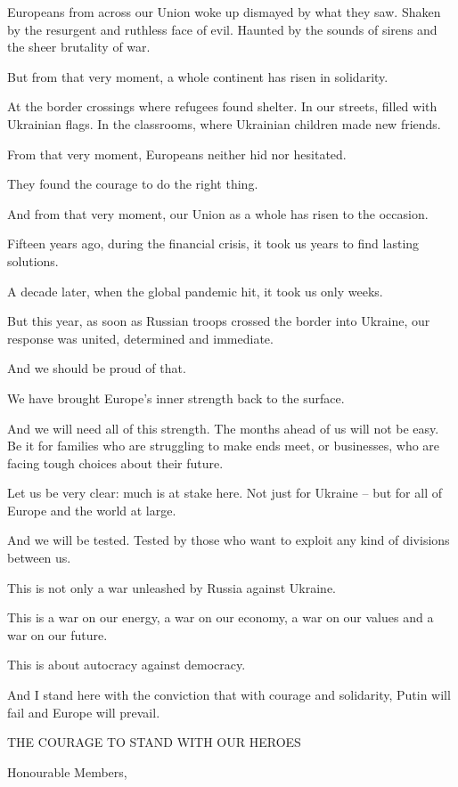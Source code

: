 \documentclass[a4paper,11pt]{article}
\begin{document}
Europeans from across our Union woke up dismayed by what they saw. Shaken by the resurgent and ruthless face of evil. Haunted by the sounds of sirens and the sheer brutality of war.

But from that very moment, a whole continent has risen in solidarity.

At the border crossings where refugees found shelter. In our streets, filled with Ukrainian flags. In the classrooms, where Ukrainian children made new friends.

From that very moment, Europeans neither hid nor hesitated.

They found the courage to do the right thing.

And from that very moment, our Union as a whole has risen to the occasion.

Fifteen years ago, during the financial crisis, it took us years to find lasting solutions.

A decade later, when the global pandemic hit, it took us only weeks.

But this year, as soon as Russian troops crossed the border into Ukraine, our response was united, determined and immediate.

And we should be proud of that.

We have brought Europe's inner strength back to the surface.

And we will need all of this strength. The months ahead of us will not be easy. Be it for families who are struggling to make ends meet, or businesses, who are facing tough choices about their future.

Let us be very clear: much is at stake here. Not just for Ukraine – but for all of Europe and the world at large.

And we will be tested. Tested by those who want to exploit any kind of divisions between us.

This is not only a war unleashed by Russia against Ukraine.

This is a war on our energy, a war on our economy, a war on our values and a war on our future.

This is about autocracy against democracy.

And I stand here with the conviction that with courage and solidarity, Putin will fail and Europe will prevail.

 

THE COURAGE TO STAND WITH OUR HEROES

Honourable Members,
\end{document}
